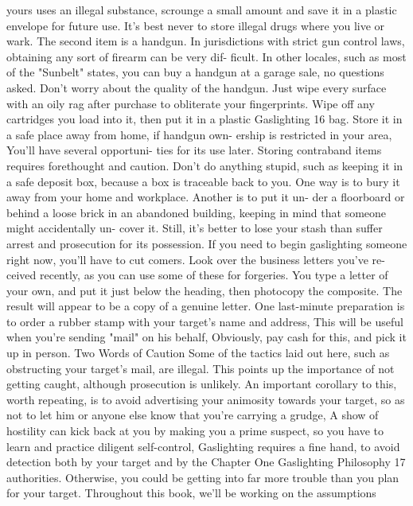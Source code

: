 \documentclass{book}
\begin{document}
yours uses an illegal substance, scrounge a small amount and 
save it in a plastic envelope for future use. It's best never to 
store illegal drugs where you live or wark. 
The second item is a handgun. In jurisdictions with strict 
gun control laws, obtaining any sort of firearm can be very dif- 
ficult. In other locales, such as most of the "Sunbelt" states, you 
can buy a handgun at a garage sale, no questions asked. Don't 
worry about the quality of the handgun. Just wipe every surface 
with an oily rag after purchase to obliterate your fingerprints. 
Wipe off any cartridges you load into it, then put it in a plastic  Gaslighting 
16 
bag. Store it in a safe place away from home, if handgun own- 
ership is restricted in your area, You'll have several opportuni- 
ties for its use later. 
Storing contraband items requires forethought and caution. 
Don't do anything stupid, such as keeping it in a safe deposit 
box, because a box is traceable back to you. One way is to bury 
it away from your home and workplace. Another is to put it un- 
der a floorboard or behind a loose brick in an abandoned 
building, keeping in mind that someone might accidentally un- 
cover it. Still, it's better to lose your stash than suffer arrest and 
prosecution for its possession. 
If you need to begin gaslighting someone right now, you'll 
have to cut comers. Look over the business letters you've re- 
ceived recently, as you can use some of these for forgeries. You 
type a letter of your own, and put it just below the heading, then 
photocopy the composite. The result will appear to be a copy of 
a genuine letter. 
One last-minute preparation is to order a rubber stamp with 
your target's name and address, This will be useful when you're 
sending "mail" on his behalf, Obviously, pay cash for this, and 
pick it up in person. 
Two Words of Caution 
Some of the tactics laid out here, such as obstructing your 
target's mail, are illegal. This points up the importance of not 
getting caught, although prosecution is unlikely. An important 
corollary to this, worth repeating, is to avoid advertising your 
animosity towards your target, so as not to let him or anyone 
else know that you're carrying a grudge, A show of hostility can 
kick back at you by making you a prime suspect, so you have to 
learn and practice diligent self-control, Gaslighting requires a 
fine hand, to avoid detection both by your target and by the 
Chapter One 
Gaslighting Philosophy 
17 
authorities. Otherwise, you could be getting into far more 
trouble than you plan for your target. 
Throughout this book, we'll be working on the assumptions 
\end{document}
